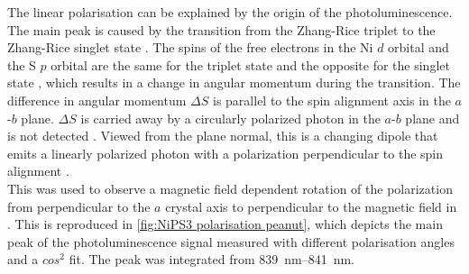 \documentclass[
	oneside,
	parskip=half,
	a4paper,
]{scrbook}
\begin{document}
The linear polarisation can be explained by the origin of the photoluminescence.
The main peak is caused by the transition from the Zhang-Rice triplet to the Zhang-Rice singlet state \cite{NiPS3_coherent}.
The spins of the free electrons in the Ni $d$ orbital and the S $p$ orbital are the same for the triplet state and the opposite for the singlet state \cite{NiPS3_coherent}, which results in a change in angular momentum during the transition.
The difference in angular momentum $\Delta S$ is parallel to the spin alignment axis in the $a$-$b$ plane.
$\Delta S$ is carried away by a circularly polarized photon in the $a$-$b$ plane and is not detected \cite{NiPS3_linear}.
Viewed from the plane normal, this is a changing dipole that emits a linearly polarized photon with a polarization perpendicular to the spin alignment \cite{NiPS3_linear}.\\
This was used to observe a magnetic field dependent rotation of the polarization from perpendicular to the $a$ crystal axis to perpendicular to the magnetic field in \cite{NiPS3_linear}.
This is reproduced in \autoref{fig:NiPS3 polarisation peanut}, which depicts the main peak of the photoluminescence signal measured with different polarisation angles and a $cos^2$ fit. The peak was integrated from \SIrange{839}{841}{nm}.
\end{document}
